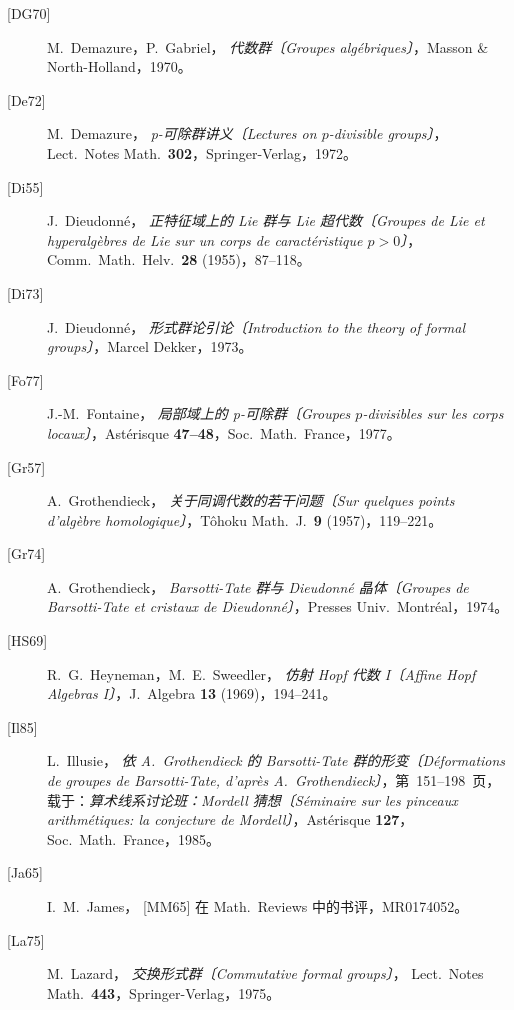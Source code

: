 \begin{description}
  \item[\textup{[DG70]}] M.~Demazure，P.~Gabriel，
  \emph{代数群〔Groupes alg\'ebriques〕}，Masson \& North-Holland，1970。

  \item[\textup{[De72]}] M.~Demazure，
  \emph{p-可除群讲义〔Lectures on \(p\)-divisible groups〕}，
  Lect.\ Notes Math.\ \textbf{302}，Springer-Verlag，1972。

  \item[\textup{[Di55]}] J.~Dieudonn\'e，
  \emph{正特征域上的 Lie 群与 Lie 超代数〔Groupes de Lie et hyperalg\`ebres de Lie sur un corps de caract\'eristique \(p>0\)〕}，Comm.\ Math.\ Helv.\ \textbf{28} (1955)，87--118。

  \item[\textup{[Di73]}] J.~Dieudonn\'e，
  \emph{形式群论引论〔Introduction to the theory of formal groups〕}，Marcel Dekker，1973。

  \item[\textup{[Fo77]}] J.-M.~Fontaine，
  \emph{局部域上的 p-可除群〔Groupes \(p\)-divisibles sur les corps locaux〕}，Ast\'erisque \textbf{47--48}，Soc.\ Math.\ France，1977。

  \item[\textup{[Gr57]}] A.~Grothendieck，
  \emph{关于同调代数的若干问题〔Sur quelques points d'alg\`ebre homologique〕}，T\^ohoku Math.\ J.\ \textbf{9} (1957)，119--221。

  \item[\textup{[Gr74]}] A.~Grothendieck，
  \emph{Barsotti-Tate 群与 Dieudonn\'e 晶体〔Groupes de Barsotti-Tate et cristaux de Dieudonn\'e〕}，Presses Univ.\ Montr\'eal，1974。

  \item[\textup{[HS69]}] R.~G.~Heyneman，M.~E.~Sweedler，
  \emph{仿射 Hopf 代数 I〔Affine Hopf Algebras I〕}，J.\ Algebra \textbf{13} (1969)，194--241。

  \item[\textup{[Il85]}] L.~Illusie，
  \emph{依 A.~Grothendieck 的 Barsotti-Tate 群的形变〔D\'eformations de groupes de Barsotti-Tate, d'apr\`es A.~Grothendieck〕}，第~151--198~页，载于：\emph{算术线系讨论班：Mordell 猜想〔S\'eminaire sur les pinceaux arithm\'etiques: la conjecture de Mordell〕}，Ast\'erisque \textbf{127}，Soc.\ Math.\ France，1985。

  \item[\textup{[Ja65]}] I.~M.~James，
  \textup{[MM65]} 在 Math.\ Reviews 中的书评，MR0174052。

  \item[\textup{[La75]}] M.~Lazard，
  \emph{交换形式群〔Commutative formal groups〕}，
  Lect.\ Notes Math.\ \textbf{443}，Springer-Verlag，1975。


\end{description}
